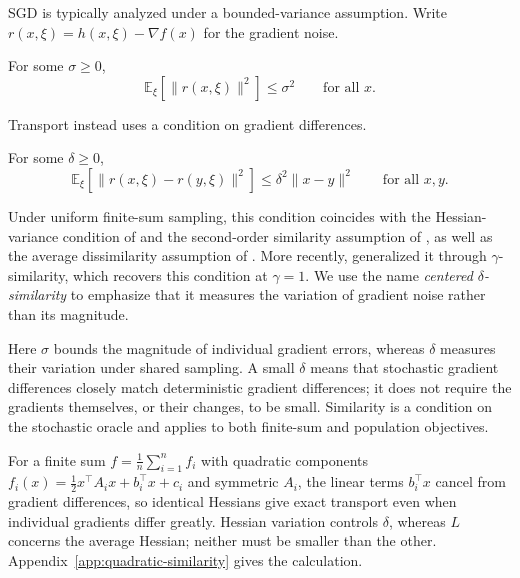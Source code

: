 SGD is typically analyzed under a bounded-variance assumption.
Write $r(x,\xi)=h(x,\xi)-\nabla f(x)$ for the gradient noise.
\begin{assumption}
\label{ass:bounded-variance}
For some $\sigma\geq0$,
\begin{equation}
\label{eq:bounded-variance}
\mathbb E_{\xi}[\|r(x,\xi)\|^2]\leq\sigma^2
\qquad\text{for all }x.
\end{equation}
\end{assumption}
Transport instead uses a condition on gradient differences.
\begin{assumption}
\label{ass:oracle-similarity}
For some $\delta\geq0$,
\begin{equation}
\label{eq:oracle-similarity}
\mathbb E_{\xi}[\|r(x,\xi)-r(y,\xi)\|^2]
\leq\delta^2\|x-y\|^2
\qquad\text{for all }x,y.
\end{equation}
\end{assumption}
Under uniform finite-sum sampling, this condition coincides with the
Hessian-variance condition of
\citet{szlendak2021permutationcompressorsprovablyfaster} and the
second-order similarity assumption of
\citet{khaled2023fasterfederatedoptimizationsecondorder}, as well as
the average dissimilarity assumption of \citet{jiang2026nonconvex}.
More recently, \citet{pmlr-v306-shulgin26b} generalized it through
$\gamma$-similarity, which recovers this condition at $\gamma=1$.
We use the name \emph{centered $\delta$-similarity} to emphasize that it
measures the variation of gradient noise rather than its magnitude.

Here $\sigma$ bounds the magnitude of individual gradient errors, whereas
$\delta$ measures their variation under shared sampling. A small $\delta$
means that stochastic gradient differences closely match deterministic
gradient differences; it does not require the gradients themselves, or
their changes, to be small. Similarity is a condition on the stochastic
oracle and applies to both finite-sum and population objectives.

For a finite sum $f=\frac1n\sum_{i=1}^n f_i$ with quadratic components
$f_i(x)=\tfrac12x^\top A_i x+b_i^\top x+c_i$ and symmetric $A_i$, the linear terms
$b_i^\top x$ cancel from gradient differences, so identical Hessians
give exact transport even when individual gradients differ greatly.
Hessian variation controls $\delta$, whereas $L$ concerns the average
Hessian; neither must be smaller than the other.
Appendix~\ref{app:quadratic-similarity} gives the calculation.


